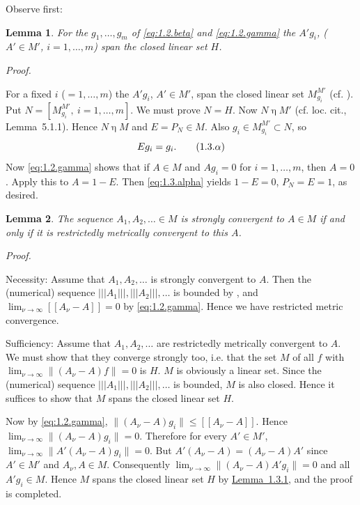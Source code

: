 \documentclass[b5paper,twoside]{article}
\newcommand{\lemref}[2]{\hyperref[#1]{\mbox{Lemma~#2}}}
\theoremstyle{mvnplain}
\newtheorem{lemma}{Lemma}[section]
\renewenvironment{proof}[1][Proof]{%
  \par\addvspace{0.35\baselineskip}%
  \noindent\textit{#1.}\ \normalfont\ignorespaces
}{%
  \par\addvspace{0.35\baselineskip}%
}
\newcommand{\M}{\mathbf M}
\newcommand{\Hilbert}{\mathfrak H}
\newcommand{\Metric}[1]{\left[\!\left[#1\right]\!\right]}
\newcommand{\OpNorm}[1]{\left\lvert\left\lvert\left\lvert#1\right\rvert\right\rvert\right\rvert}
\def\M{M}%
\def\Hilbert{H}%
\def\Metric#1{[[#1]]}%
\def\mathfrak#1{#1}%
\begin{document}
Observe first:
\begin{lemma}\label{lem:1.3.1}
For the $g_1,\ldots,g_m$ of \eqref{eq:1.2.beta} and \eqref{eq:1.2.gamma} the
$A'g_i$, ($A'\in\M'$, $i=1,\ldots,m$) span the closed linear set $\Hilbert$.
\end{lemma}
\begin{proof}
For a fixed $i$ ($=1,\ldots,m$) the $A'g_i$, $A'\in\M'$, span the closed
linear set $\mathfrak M_{g_i}^{\M'}$ (cf. \cite[p.~143,
Definition~5.1.1]{ref5}).  Put
$\mathfrak N=[\mathfrak M_{g_i}^{\M'},\ i=1,\ldots,m]$.  We must prove
$\mathfrak N=\Hilbert$.  Now $\mathfrak N\mathrel{\eta}\M'$ (cf. loc. cit.,
Lemma~5.1.1).  Hence $\mathfrak N\mathrel{\eta}\M$ and $E=P_{\mathfrak N}\in\M$.
Also $g_i\in\mathfrak M_{g_i}^{\M'}\subset\mathfrak N$, so
\begin{equation}
  Eg_i=g_i.
  \tag{1.3.\ensuremath{\alpha}}\label{eq:1.3.alpha}
\end{equation}
Now \eqref{eq:1.2.gamma} shows that if $A\in\M$ and $Ag_i=0$ for
$i=1,\ldots,m$, then $A=0$.  Apply this to $A=1-E$.  Then
\eqref{eq:1.3.alpha} yields $1-E=0$, $P_{\mathfrak N}=E=1$, as desired.
\end{proof}

\begin{lemma}\label{lem:1.3.2}
The sequence $A_1,A_2,\ldots\in\M$ is strongly convergent to $A\in\M$ if and
only if it is restrictedly metrically convergent to this $A$.
\end{lemma}
\begin{proof}
Necessity: Assume that $A_1,A_2,\ldots$ is strongly convergent to $A$.  Then
the (numerical) sequence $\OpNorm{A_1},\OpNorm{A_2},\ldots$ is bounded by
\cite[p.~382, footnote~35]{ref2}, and
$\lim_{\nu\to\infty}\Metric{A_\nu-A}=0$ by \eqref{eq:1.2.gamma}.  Hence we
have restricted metric convergence.

Sufficiency: Assume that $A_1,A_2,\ldots$ are restrictedly metrically
convergent to $A$.  We must show that they converge strongly too, i.e. that the
set $\mathfrak M$ of all $f$ with
$\lim_{\nu\to\infty}\lVert(A_\nu-A)f\rVert=0$ is $\Hilbert$.
$\mathfrak M$ is obviously a linear set.  Since the (numerical) sequence
$\OpNorm{A_1},\OpNorm{A_2},\ldots$ is bounded, $\mathfrak M$ is also closed.
Hence it suffices to show that $\mathfrak M$ spans the closed linear set
$\Hilbert$.

Now by \eqref{eq:1.2.gamma},
$\lVert(A_\nu-A)g_i\rVert\leq\Metric{A_\nu-A}$.  Hence
$\lim_{\nu\to\infty}\lVert(A_\nu-A)g_i\rVert=0$.  Therefore for every
$A'\in\M'$, $\lim_{\nu\to\infty}\lVert A'(A_\nu-A)g_i\rVert=0$.  But
$A'(A_\nu-A)=(A_\nu-A)A'$ since $A'\in\M'$ and $A_\nu,A\in\M$.
Consequently
$\lim_{\nu\to\infty}\lVert(A_\nu-A)A'g_i\rVert=0$ and all
$A'g_i\in\mathfrak M$.  Hence $\mathfrak M$ spans the closed linear set
$\Hilbert$ by \lemref{lem:1.3.1}{1.3.1}, and the proof is completed.
\end{proof}
\end{document}
